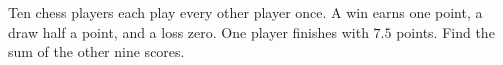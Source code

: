 Ten chess players each play every other player once. A win earns one point, a draw half a point, and a loss zero. One player finishes with $7.5$ points. Find the sum of the other nine scores.
